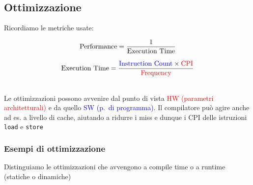 \subsection{Ottimizzazione}

Ricordiamo le metriche usate:

\noindent\begin{minipage}[c]{.5\textwidth}
\begin{equation*}
  \text{Performance} = {{1}\over\text{Execution Time}}
\end{equation*}
\end{minipage}
\begin{minipage}[c]{.5\textwidth}
\begin{equation*}
  \text{Execution Time} = {\textcolor{blue}{\text{Instruction Count}} \times \textcolor{red}{\text{CPI}} \over \textcolor{red}{\text{Frequency}}}
\end{equation*}
\end{minipage}\\

Le ottimizzazioni possono avvenire dal punto di vista \textcolor{red}{HW (parametri architetturali)} e da quello \textcolor{blue}{SW (p.~di programma)}. Il compilatore pu\`o agire anche ad es. a livello di cache, aiutando a ridurre i miss e dunque i CPI delle istruzioni \lstinline|load| e \lstinline|store|

\subsubsection{Esempi di ottimizzazione}

\begin{emphasize}
  Distinguiamo le ottimizzazioni che avvengono a compile time o a runtime (statiche o dinamiche)
\end{emphasize}


